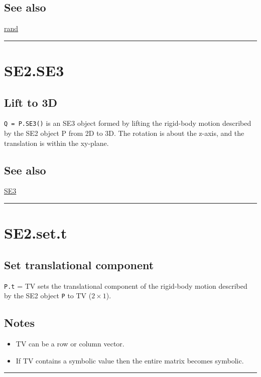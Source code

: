 \subsection*{See also}


\hyperlink{rand}{\color{blue} rand}

\vspace{1.5ex}\hrule

\hypertarget{SE2.SE3}{\section*{SE2.SE3}}
\subsection*{Lift to 3D}


\texttt{Q = P.SE3()} is an SE3 object formed by lifting the rigid-body motion
described by the SE2 object P from 2D to 3D.  The rotation is about the
z-axis, and the translation is within the xy-plane.


\subsection*{See also}


\hyperlink{SE3}{\color{blue} SE3}

\vspace{1.5ex}\hrule

\hypertarget{SE2.set.t}{\section*{SE2.set.t}}
\subsection*{Set translational component}


\texttt{P.t} = TV sets the translational component of the rigid-body motion
described by the SE2 object \texttt{P} to TV ($2 \times 1$).


\subsection*{Notes}
\begin{itemize}
  \item TV can be a row or column vector.
  \item If TV contains a symbolic value then the entire matrix becomes    symbolic.
\end{itemize}
\vspace{1.5ex}\hrule

